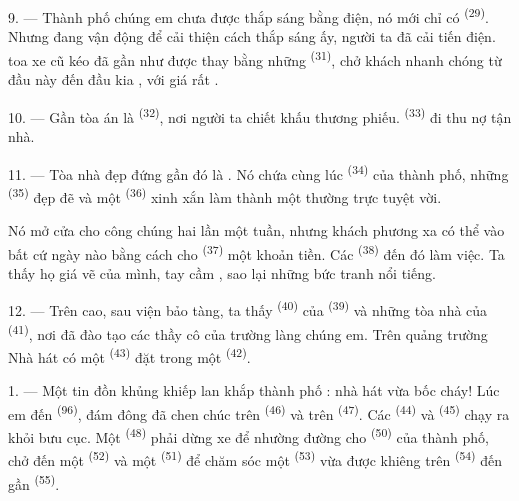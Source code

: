 \VUsaut{4.0mm}
\VUsaut{3.4mm}

9. --- Thành phố chúng em chưa được thắp sáng bằng điện, nó mới chỉ có 
\textsuperscript{(29)}. Nhưng  đang vận động để cải thiện cách thắp
sáng ấy,  người ta đã cải tiến   điện.
 toa xe cũ   kéo đã gần như được thay bằng những
 \textsuperscript{(31)}, chở khách nhanh chóng từ đầu này đến
đầu kia , với giá rất .

10. --- Gần tòa án là  \textsuperscript{(32)}, nơi người ta chiết khấu
thương phiếu.  \textsuperscript{(33)} đi thu nợ tận nhà.

\VUsaut{4.0mm}
\VUsaut{3.4mm}

11. --- Tòa nhà đẹp đứng gần đó là . Nó chứa cùng lúc  \textsuperscript{(34)} của thành phố, những 
\textsuperscript{(35)} đẹp đẽ và một  \textsuperscript{(36)} xinh xắn
làm thành một  thường trực tuyệt vời.

Nó mở cửa cho công chúng hai lần một tuần, nhưng khách phương xa có thể vào bất cứ ngày
nào bằng cách cho  \textsuperscript{(37)} một khoản tiền. Các
 \textsuperscript{(38)} đến đó làm việc. Ta thấy họ  giá vẽ
của mình, tay cầm , sao lại những bức tranh nổi tiếng.

12. --- Trên cao, sau viện bảo tàng, ta thấy  \textsuperscript{(40)} của
 \textsuperscript{(39)} và những tòa nhà của 
\textsuperscript{(41)}, nơi đã đào tạo các thầy cô của trường làng chúng em. Trên quảng
trường Nhà hát có một  \textsuperscript{(43)} đặt trong một  \textsuperscript{(42)}.

\VUsaut{5.0mm}
\VUsaut{3.0mm}

\VUsaut{3.4mm}

1. --- Một tin đồn khủng khiếp lan khắp thành phố : nhà hát vừa bốc cháy! Lúc em đến
 \textsuperscript{(96)}, đám đông đã chen chúc trên 
\textsuperscript{(46)} và trên  \textsuperscript{(47)}. Các
 \textsuperscript{(44)} và 
\textsuperscript{(45)} chạy ra khỏi bưu cục. Một 
\textsuperscript{(48)} phải dừng xe để nhường đường cho 
\textsuperscript{(50)} của thành phố, chở đến một 
\textsuperscript{(52)} và một  \textsuperscript{(51)} để chăm sóc một
 \textsuperscript{(53)} vừa được khiêng trên 
\textsuperscript{(54)} đến gần  \textsuperscript{(55)}.

